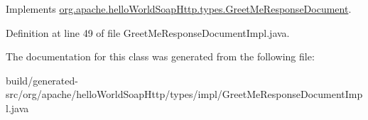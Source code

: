 Implements \hyperlink{interfaceorg_1_1apache_1_1hello_world_soap_http_1_1types_1_1_greet_me_response_document_aec66bd3080b0476b7e8a6e4623b2aff2}{org.\+apache.\+hello\+World\+Soap\+Http.\+types.\+Greet\+Me\+Response\+Document}.



Definition at line 49 of file Greet\+Me\+Response\+Document\+Impl.\+java.



The documentation for this class was generated from the following file\+:\begin{DoxyCompactItemize}
\item 
build/generated-\/src/org/apache/hello\+World\+Soap\+Http/types/impl/Greet\+Me\+Response\+Document\+Impl.\+java\end{DoxyCompactItemize}
